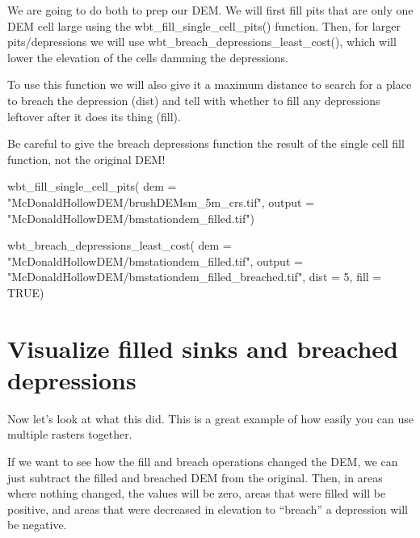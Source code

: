 \documentclass[
]{book}
\newenvironment{Shaded}{\begin{snugshade}}{\end{snugshade}}
\newcommand{\AttributeTok}[1]{\textcolor[rgb]{0.77,0.63,0.00}{#1}}
\newcommand{\ConstantTok}[1]{\textcolor[rgb]{0.00,0.00,0.00}{#1}}
\newcommand{\DecValTok}[1]{\textcolor[rgb]{0.00,0.00,0.81}{#1}}
\newcommand{\FunctionTok}[1]{\textcolor[rgb]{0.00,0.00,0.00}{#1}}
\newcommand{\NormalTok}[1]{#1}
\newcommand{\StringTok}[1]{\textcolor[rgb]{0.31,0.60,0.02}{#1}}
\begin{document}
We are going to do both to prep our DEM. We will first fill pits that are only one DEM cell large using the wbt\_fill\_single\_cell\_pits() function. Then, for larger pits/depressions we will use wbt\_breach\_depressions\_least\_cost(), which will lower the elevation of the cells damming the depressions.

To use this function we will also give it a maximum distance to search for a place to breach the depression (dist) and tell with whether to fill any depressions leftover after it does its thing (fill).

Be careful to give the breach depressions function the result of the single cell fill function, not the original DEM!

\begin{Shaded}
\begin{Highlighting}[]
\FunctionTok{wbt\_fill\_single\_cell\_pits}\NormalTok{(}
                    \AttributeTok{dem =} \StringTok{"McDonaldHollowDEM/brushDEMsm\_5m\_crs.tif"}\NormalTok{,}
                    \AttributeTok{output =} \StringTok{"McDonaldHollowDEM/bmstationdem\_filled.tif"}\NormalTok{)}

\FunctionTok{wbt\_breach\_depressions\_least\_cost}\NormalTok{(}
                     \AttributeTok{dem =} \StringTok{"McDonaldHollowDEM/bmstationdem\_filled.tif"}\NormalTok{,}
                     \AttributeTok{output =} \StringTok{"McDonaldHollowDEM/bmstationdem\_filled\_breached.tif"}\NormalTok{,}
                     \AttributeTok{dist =} \DecValTok{5}\NormalTok{,}
                     \AttributeTok{fill =} \ConstantTok{TRUE}\NormalTok{)}
\end{Highlighting}
\end{Shaded}

\hypertarget{visualize-filled-sinks-and-breached-depressions}{%
\section{Visualize filled sinks and breached depressions}\label{visualize-filled-sinks-and-breached-depressions}}

Now let's look at what this did. This is a great example of how easily you can use multiple rasters together.

If we want to see how the fill and breach operations changed the DEM, we can just subtract the filled and breached DEM from the original. Then, in areas where nothing changed, the values will be zero, areas that were filled will be positive, and areas that were decreased in elevation to ``breach'' a depression will be negative.
\end{document}
